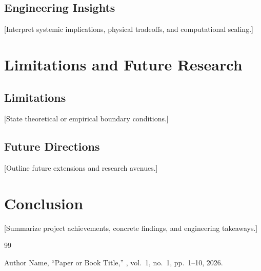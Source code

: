\documentclass[12pt,a4paper]{report}
\begin{document}
\section{Engineering Insights}
[Interpret systemic implications, physical tradeoffs, and computational scaling.]

\chapter{Limitations and Future Research}
\label{chap:limitations}

\section{Limitations}
[State theoretical or empirical boundary conditions.]

\section{Future Directions}
[Outline future extensions and research avenues.]

\chapter{Conclusion}
\label{chap:conclusion}
[Summarize project achievements, concrete findings, and engineering takeaways.]

\newpage
\begin{thebibliography}{99}

Author Name,
\newblock ``Paper or Book Title,''
, vol.~1, no.~1, pp.~1--10, 2026.

\end{thebibliography}
\end{document}
